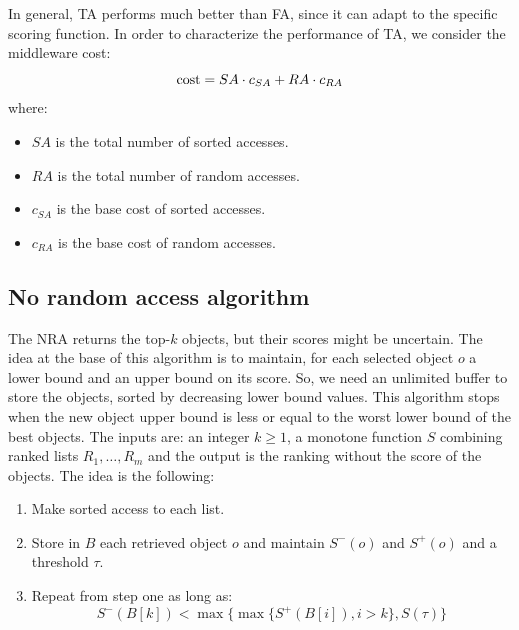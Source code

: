 In general, TA performs much better than FA, since it can adapt to the specific scoring function. In order to characterize the 
performance of TA, we consider the middleware cost: 
\[\textnormal{cost} = SA \cdot c_{SA} + RA \cdot c_{RA}\]
where:
\begin{itemize}
    \item $SA$ is the total number of sorted accesses.
    \item $RA$ is the total number of random accesses.
    \item $c_{SA}$ is the base cost of sorted accesses.
    \item $c_{RA}$ is the base cost of random accesses.
\end{itemize}

\subsection*{No random access algorithm}
The NRA returns the top-$k$ objects, but their scores might be uncertain. The idea at the base of this algorithm is to maintain, for each selected object
$o$ a lower bound and an upper bound on its score. So, we need an unlimited buffer to 
store the objects, sorted by decreasing lower bound values. This algorithm 
stops when the new object upper bound is less or equal to the worst lower bound of the best objects. The inputs are: 
an integer $k \geq 1$, a monotone function $S$ combining ranked lists $R_1, \dots, R_m$ and the output is the ranking
without the score of the objects. The idea is the following: 
\begin{enumerate}
    \item Make sorted access to each list. 
    \item Store in $B$ each retrieved object $o$ and maintain $S^{-}(o)$ and $S^{+}(o)$ and a threshold $\tau$. 
    \item Repeat from step one as long as:
        \[S^{-}(B[k]) < \max\{ \max\{S^{+}(B[i]), i > k\}, S(\tau) \}\]
\end{enumerate}
